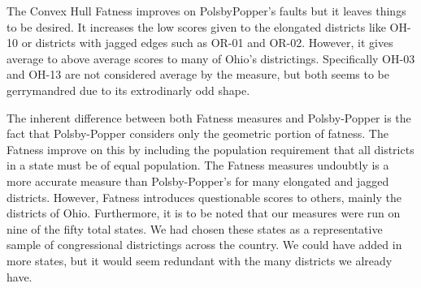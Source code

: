 \documentclass[letterpaper]{article}
\begin{document}
The Convex Hull Fatness improves on PolsbyPopper's faults but it leaves things to be desired. It increases the low scores given to the elongated districts like OH-10 or districts with jagged edges such as OR-01 and OR-02. However, it gives average to above average scores to many of Ohio's districtings. Specifically OH-03 and OH-13 are not considered average by the measure, but both seems to be gerrymandred due to its extrodinarly odd shape.

The inherent difference between both Fatness measures and Polsby-Popper is the fact that Polsby-Popper considers only the geometric portion of fatness. The Fatness improve on this by including the population requirement that all districts in a state must be of equal population. The Fatness measures undoubtly is a more accurate measure than Polsby-Popper's for many elongated and jagged districts. 
However, Fatness introduces questionable scores to others, mainly the districts of Ohio. Furthermore, it is to be noted that our measures were run on nine of the fifty total states. We had chosen these states as a representative sample of congressional districtings across the country. We could have added in more states, but it would seem redundant with the many districts we already have.

\printbibliography
\end{document}
